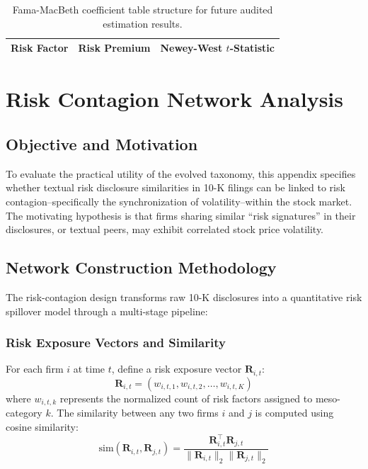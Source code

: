 \documentclass[11pt, a4paper]{article}
\begin{document}
\begin{table}[H]
\centering
\caption{Fama-MacBeth coefficient table structure for future audited estimation results.}
\label{tab:fmb_batch_template}
\vspace{0.2cm}
\renewcommand{\arraystretch}{1.15}
\begin{tabular}{lll}
\toprule
\textbf{Risk Factor} & \textbf{Risk Premium} & \textbf{Newey-West $t$-Statistic} \\
\midrule
\bottomrule
\end{tabular}
\end{table}

\newpage

\section{Risk Contagion Network Analysis}

\subsection{Objective and Motivation}
To evaluate the practical utility of the evolved taxonomy, this appendix specifies whether textual risk disclosure similarities in 10-K filings can be linked to risk contagion--specifically the synchronization of volatility--within the stock market. The motivating hypothesis is that firms sharing similar ``risk signatures'' in their disclosures, or textual peers, may exhibit correlated stock price volatility.

\subsection{Network Construction Methodology}
The risk-contagion design transforms raw 10-K disclosures into a quantitative risk spillover model through a multi-stage pipeline:

\subsubsection{Risk Exposure Vectors and Similarity}
For each firm $i$ at time $t$, define a risk exposure vector $\mathbf{R}_{i,t}$:
\begin{equation}
    \mathbf{R}_{i,t} = (w_{i,t,1}, w_{i,t,2}, \dots, w_{i,t,K})
\end{equation}
where $w_{i,t,k}$ represents the normalized count of risk factors assigned to meso-category $k$. The similarity between any two firms $i$ and $j$ is computed using cosine similarity:
\begin{equation}
    \text{sim}(\mathbf{R}_{i,t}, \mathbf{R}_{j,t}) = \frac{\mathbf{R}_{i,t}^\top \mathbf{R}_{j,t}}{\|\mathbf{R}_{i,t}\|_2 \|\mathbf{R}_{j,t}\|_2}
\end{equation}
\end{document}
